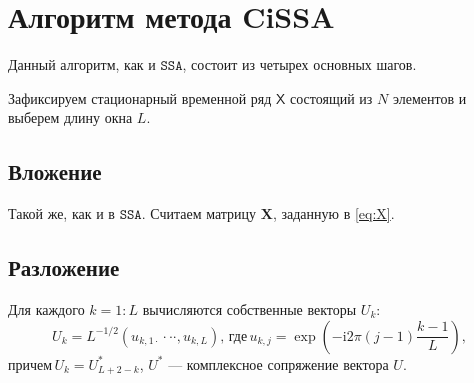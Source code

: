 \documentclass[12pt, specialist, subf
]{disser}
\theoremstyle{definition}
\newcommand{\SSA}{\texttt{SSA}}
\newcommand{\TS}{\mathsf{X}}
\newtheorem{definition}{Определение} %
\begin{document}

\section{Алгоритм метода CiSSA}

Данный алгоритм, как и $\SSA$, состоит из четырех основных шагов.

Зафиксируем стационарный временной ряд $\TS$ состоящий из $N$ элементов и выберем длину окна $L$.
\subsection*{Вложение}
Такой же, как и в $\SSA$. Считаем матрицу $\mathbf{X}$, заданную в \eqref{eq:X}.

\subsection*{Разложение}

Для каждого $k = 1:L$ вычисляются собственные векторы ${U}_{k}$:
\begin{equation*}
	{U}_{k}=L^{-1/2}(u_{k,1\cdot}\cdot\cdot\cdot,u_{k,L}), \, \text{где} \,
	u_{k,j}=\exp\left(-\mathrm{i}2\pi(j-1)\frac{k-1}{L}\right),
\end{equation*}
$\text{причем} \, U_{k} = U_{L+2-k}^*$,  $U^*$ --- комплексное сопряжение вектора $U$.
\end{document}
